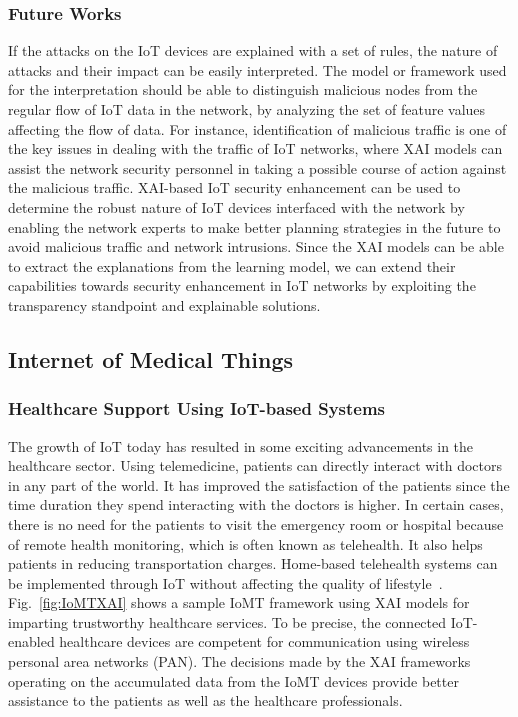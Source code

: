 \documentclass[journal]{IEEEtran}
\begin{document}
\subsubsection{Future Works}
If the attacks on the IoT devices are explained with a set of rules, the nature of attacks and their impact can be easily interpreted. The model or framework used for the interpretation should be able to distinguish malicious nodes from the regular flow of IoT data in the network, by analyzing the set of feature values affecting the flow of data. For instance, identification of malicious traffic is one of the key issues in dealing with the traffic of IoT networks, where XAI models can assist the network security personnel in taking a possible course of action against the malicious traffic. XAI-based IoT security enhancement can be used to determine the robust nature of IoT devices interfaced with the network by enabling the network experts to make better planning strategies in the future to avoid malicious traffic and network intrusions. Since the XAI models can be able to extract the explanations from the learning model, we can extend their capabilities towards security enhancement in IoT networks by exploiting the transparency standpoint and explainable solutions.

\subsection{Internet of Medical Things}

\subsubsection{Healthcare Support Using IoT-based Systems}
The growth of IoT today has resulted in some exciting advancements in the healthcare sector. Using telemedicine, patients can directly interact with doctors in any part of the world. It has improved the satisfaction of the patients since the time duration they spend interacting with the doctors is higher. In certain cases, there is no need for the patients to visit the emergency room or hospital because of remote health monitoring, which is often known as telehealth. It also helps patients in reducing transportation charges. Home-based telehealth systems can be implemented through IoT without affecting the quality of lifestyle~\cite{ullah2016effective}. Fig.~\ref{fig:IoMTXAI} shows a sample IoMT framework using XAI models for imparting trustworthy healthcare services. To be precise, the connected IoT-enabled healthcare devices are competent for communication using wireless personal area networks (PAN). The decisions made by the XAI frameworks operating on the accumulated data from the IoMT devices provide better assistance to the patients as well as the healthcare professionals. 
\end{document}
